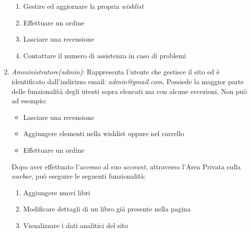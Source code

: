 \begin{enumerate}
\begin{enumerate}[label*=\arabic*.]
		\item Gestire ed aggiornare la propria \textit{wishlist}
		\item Effettuare un ordine
		\item Lasciare una recensione
		\item Contattare il numero di assistenza in caso di problemi
	\end{enumerate}
	\item \textit{ Amministratore(admin)}: Rappresenta l’utente che gestisce il sito ed è identificato dall’indirizzo email: \textit{admin@gmail.com}. Possiede la maggior parte delle funzionalità degli utenti sopra elencati ma con alcune eccezioni. Non può ad esempio:
		\begin{itemize}
			\item Lasciare una recensione
			\item Aggiungere elementi nella wishlist oppure nel carrello
			\item Effettuare un ordine
		\end{itemize}
Dopo aver effettuato l’accesso al suo \textit{account}, attraverso l’Area Privata sulla \textit{navbar}, può eseguire le seguenti funzionalità:
	\begin{enumerate}[label*=\arabic*.]
		\item Aggiungere nuovi libri
		\item Modificare dettagli di un libro già presente nella pagina 
		\item Visualizzare i dati analitici del sito
	\end{enumerate}
\end{enumerate}